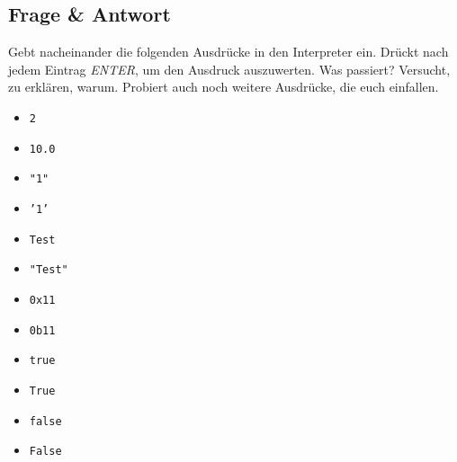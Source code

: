 \subsection{Frage \& Antwort}

Gebt nacheinander die folgenden Ausdrücke in den Interpreter ein. Drückt nach
jedem Eintrag \textit{ENTER}, um den Ausdruck auszuwerten. Was passiert?
Versucht, zu erklären, warum. Probiert auch noch weitere Ausdrücke, die euch
einfallen.

\begin{multicols}{3}
    \begin{itemize}
        \item \texttt{2}
        \item \texttt{10.0}
        \item \texttt{"1"}
        \item \texttt{'1'}
        \item \texttt{Test}
        \item \texttt{"Test"}
        \item \texttt{0x11}
        \item \texttt{0b11}
        \item \texttt{true}
        \item \texttt{True}
        \item \texttt{false}
        \item \texttt{False}
    \end{itemize}
\end{multicols}

